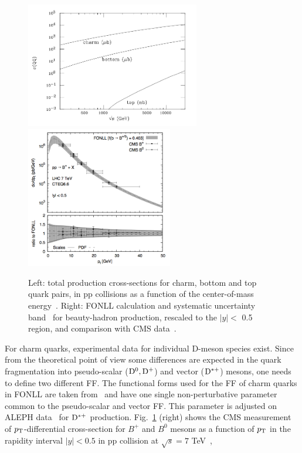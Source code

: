 \begin{figure}[!ht]
  \centering
  \includegraphics[width=7.6cm]{FigCap2/HQxsecPPcoll.png}
      \includegraphics[width=6.4cm]{FigCap2/FONLLBmeson.png}
  \caption{Left: total production cross-sections for charm, bottom and top quark pairs, in pp collisions as a function of the center-of-mass energy~\cite{Mangano:1997ri}. Right: FONLL calculation and systematic uncertainty band~\cite{Cacciari:2012ny} for beauty-hadron production, rescaled to the $|y| <$ 0.5 region, and comparison with CMS data~\cite{Khachatryan:2011mk,Chatrchyan:2011pw}.}
  \label{fig:HQxsecPPcoll}
\end{figure}
For charm quarks, experimental data for individual D-meson species exist.
Since from the theoretical point of view some differences are 
expected in the quark fragmentation into 
pseudo-scalar (${\rm D^0}, {\rm D^+}$) and vector (${\rm D^{*+}}$) mesons, 
one needs to define two different FF. The functional forms used for
the FF of charm quarks in FONLL are taken from~\cite{Cacciari:2003zu}
and have one single non-perturbative parameter
common to the pseudo-scalar and vector FF. This parameter is adjusted on
ALEPH data~\cite{Barate:1999bg} for ${\rm D^{*+}}$ production.
Fig.~\ref{fig:HQxsecPPcoll} (right) shows the CMS measurement 
of $p_{\rm T}$-differential cross-section for $B^+$ and $B^0$ mesons
as a function of $p_{\rm T}$ in the rapidity interval $|y| < 0.5$ in pp collision 
at $\sqrt{s} = 7$ TeV~\cite{Khachatryan:2011mk,Chatrchyan:2011pw}, 
